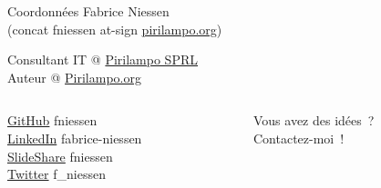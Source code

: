 \documentclass[presentation,t]{beamer}
\begin{document}
\begin{frame}[label={sec:org40967db}]{Coordonnées}
Fabrice Niessen \\
(concat \og fniessen\fg{} at-sign \og \href{http://www.pirilampo.org/}{pirilampo.org}\fg{})

Consultant IT @ \href{http://www.pirilampo.be/}{Pirilampo SPRL} \\
Auteur @ \href{http://www.pirilampo.org/}{Pirilampo.org}

\begin{columns}
\begin{column}{0.48\columnwidth}
\href{https://github.com/fniessen}{GitHub} fniessen \\
\href{http://be.linkedin.com/pub/fabrice-niessen/0/a42/200}{LinkedIn} fabrice-niessen \\
\href{http://www.slideshare.net/fniessen}{SlideShare} fniessen \\
\href{https://twitter.com/f\_niessen}{Twitter} f\_niessen \\
\end{column}

\begin{column}{0.48\columnwidth}
Vous avez des idées~? \\
Contactez-moi~!
\end{column}
\end{columns}
\end{frame}
\end{document}
